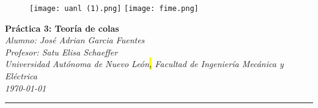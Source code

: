 \documentclass[10pt,a4paper]{article}
\author{José Adrian Garcia fUENTES}
\begin{document}
	\begin{figure}[H]
		\raggedright
		\texttt{[image: uanl (1).png]} \hfill \texttt{[image: fime.png]}
	\end{figure}

	\vspace{6mm}
	
	\begin{center}
		{\Large \textbf{Práctica 3: Teoría de colas}}\\
		\vspace{2mm}
		\textit{ Alumno: José Adrian Garcia Fuentes}\\
		\textit{Profesor: Satu Elisa Schaeffer}\\
		\vspace{2.5mm}
		\textit{Universidad Autónoma de Nuevo León\hl{,} Facultad de Ingeniería Mecánica y Eléctrica\hl{ }}\\
		\vspace{1mm}
		\textit {\today}
		
		
	\end{center}
	\begin{center}
		\textcolor{azul}{\rule{150mm}{0.8mm}}
	\end{center}
	
	\vspace{5mm}
\end{document}
